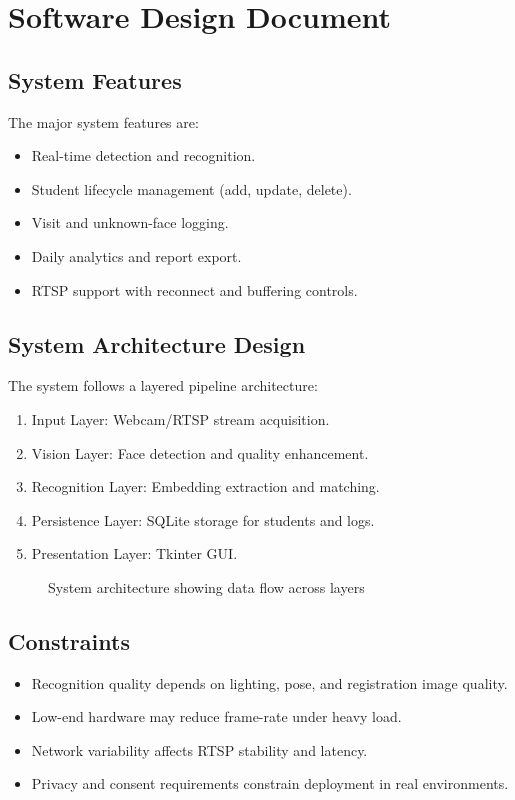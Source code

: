 \documentclass{fisatprojectfinal}
\begin{document}
\section{Software Design Document}

\subsection {System Features}
The major system features are:
\begin{itemize}
	\item Real-time detection and recognition.
	\item Student lifecycle management (add, update, delete).
	\item Visit and unknown-face logging.
	\item Daily analytics and report export.
	\item RTSP support with reconnect and buffering controls.
\end{itemize}

\subsection{System Architecture Design}
The system follows a layered pipeline architecture:
\begin{enumerate}
	\item Input Layer: Webcam/RTSP stream acquisition.
	\item Vision Layer: Face detection and quality enhancement.
	\item Recognition Layer: Embedding extraction and matching.
	\item Persistence Layer: SQLite storage for students and logs.
	\item Presentation Layer: Tkinter GUI.
\end{enumerate}

\begin{figure}[h!]
	\begin{center}
		\fbox{\rule{0pt}{2in}\rule{0.8\linewidth}{0pt}}
		\caption{System architecture showing data flow across layers}
	\end{center}
\end{figure}

\subsection{Constraints}
\begin{itemize}
	\item Recognition quality depends on lighting, pose, and registration image quality.
	\item Low-end hardware may reduce frame-rate under heavy load.
	\item Network variability affects RTSP stability and latency.
	\item Privacy and consent requirements constrain deployment in real environments.
\end{itemize}
\end{document}
